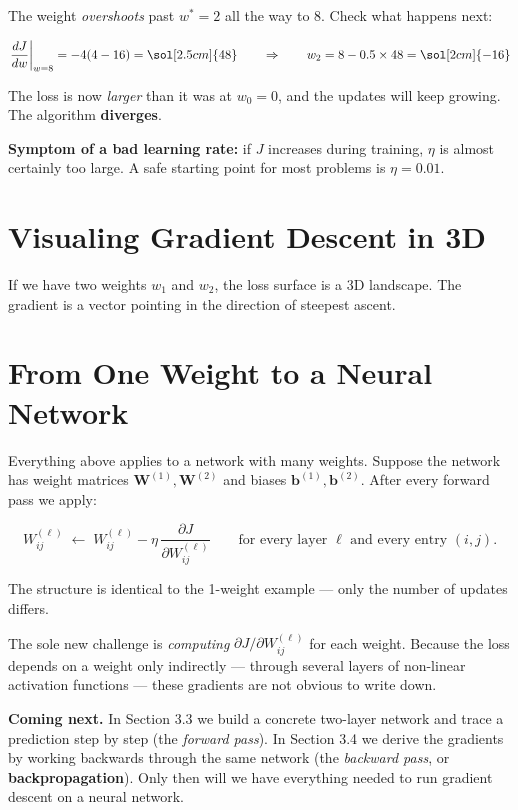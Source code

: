 \documentclass[12pt, a4paper]{article}
\begin{document}
The weight \emph{overshoots} past $w^* = 2$ all the way to $8$.
Check what happens next:

\[
  \left.\frac{dJ}{dw}\right|_{w=8}
  = -4(4 - 16) = \sol[2.5cm]{48}
  \qquad\Rightarrow\qquad
  w_2 = 8 - 0.5 \times 48 = \sol[2cm]{-16}
\]

The loss is now \emph{larger} than it was at $w_0 = 0$, and the updates
will keep growing.  The algorithm \textbf{diverges}.

\begin{warnbox}
  \textbf{Symptom of a bad learning rate:} if $J$ increases during training,
  $\eta$ is almost certainly too large.  A safe starting point for most
  problems is $\eta = 0.01$.
\end{warnbox}

\section{Visualing Gradient Descent in 3D}

If we have two weights $w_1$ and $w_2$, the loss surface is a 3D landscape. The gradient is a vector pointing in the direction of steepest ascent.


\section{From One Weight to a Neural Network}

Everything above applies to a network with many weights.
Suppose the network has weight matrices $\mathbf{W}^{(1)}, \mathbf{W}^{(2)}$
and biases $\mathbf{b}^{(1)}, \mathbf{b}^{(2)}$.
After every forward pass we apply:

\[
  W_{ij}^{(\ell)} \;\longleftarrow\;
  W_{ij}^{(\ell)} - \eta\,\frac{\partial J}{\partial W_{ij}^{(\ell)}}
  \qquad \text{for every layer } \ell \text{ and every entry } (i,j).
\]

The structure is identical to the 1-weight example --- only the number of
updates differs.

The sole new challenge is \emph{computing}
$\partial J / \partial W_{ij}^{(\ell)}$ for each weight.
Because the loss depends on a weight only indirectly --- through several
layers of non-linear activation functions --- these gradients are not
obvious to write down.

\begin{notebox}
  \textbf{Coming next.}
  In Section 3.3 we build a concrete two-layer network and trace a prediction
  step by step (the \emph{forward pass}).  In Section 3.4 we derive the
  gradients by working backwards through the same network
  (the \emph{backward pass}, or \textbf{backpropagation}).
  Only then will we have everything needed to run gradient descent on a
  neural network.
\end{notebox}
\end{document}
